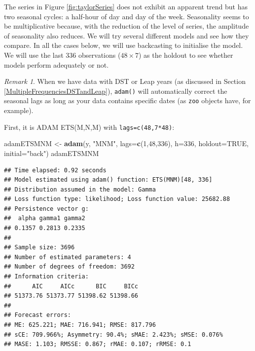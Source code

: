 \documentclass[]{book}
\newenvironment{Shaded}{\begin{snugshade}}{\end{snugshade}}
\newcommand{\DataTypeTok}[1]{\textcolor[rgb]{0.13,0.29,0.53}{#1}}
\newcommand{\DecValTok}[1]{\textcolor[rgb]{0.00,0.00,0.81}{#1}}
\newcommand{\KeywordTok}[1]{\textcolor[rgb]{0.13,0.29,0.53}{\textbf{#1}}}
\newcommand{\NormalTok}[1]{#1}
\newcommand{\OtherTok}[1]{\textcolor[rgb]{0.56,0.35,0.01}{#1}}
\newcommand{\StringTok}[1]{\textcolor[rgb]{0.31,0.60,0.02}{#1}}
\theoremstyle{definition}
\theoremstyle{definition}
\theoremstyle{definition}
\theoremstyle{definition}
\theoremstyle{remark}
\newtheorem*{remark}{Remark}
\begin{document}
The series in Figure \ref{fig:taylorSeries} does not exhibit an apparent trend but has two seasonal cycles: a half-hour of day and day of the week. Seasonality seems to be multiplicative because, with the reduction of the level of series, the amplitude of seasonality also reduces. We will try several different models and see how they compare. In all the cases below, we will use backcasting to initialise the model. We will use the last 336 observations (\(48 \times 7\)) as the holdout to see whether models perform adequately or not.

\begin{remark}
When we have data with DST or Leap years (as discussed in Section \ref{MultipleFrequenciesDSTandLeap}), \texttt{adam()} will automatically correct the seasonal lags as long as your data contains specific dates (as \texttt{zoo} objects have, for example).
\end{remark}

First, it is ADAM ETS(M,N,M) with \texttt{lags=c(48,7*48)}:

\begin{Shaded}
\begin{Highlighting}[]
\NormalTok{adamETSMNM <-}\StringTok{ }\KeywordTok{adam}\NormalTok{(y, }\StringTok{"MNM"}\NormalTok{, }\DataTypeTok{lags=}\KeywordTok{c}\NormalTok{(}\DecValTok{1}\NormalTok{,}\DecValTok{48}\NormalTok{,}\DecValTok{336}\NormalTok{),}
                   \DataTypeTok{h=}\DecValTok{336}\NormalTok{, }\DataTypeTok{holdout=}\OtherTok{TRUE}\NormalTok{,}
                   \DataTypeTok{initial=}\StringTok{"back"}\NormalTok{)}
\NormalTok{adamETSMNM}
\end{Highlighting}
\end{Shaded}

\begin{verbatim}
## Time elapsed: 0.92 seconds
## Model estimated using adam() function: ETS(MNM)[48, 336]
## Distribution assumed in the model: Gamma
## Loss function type: likelihood; Loss function value: 25682.88
## Persistence vector g:
##  alpha gamma1 gamma2 
## 0.1357 0.2813 0.2335 
## 
## Sample size: 3696
## Number of estimated parameters: 4
## Number of degrees of freedom: 3692
## Information criteria:
##      AIC     AICc      BIC     BICc 
## 51373.76 51373.77 51398.62 51398.66 
## 
## Forecast errors:
## ME: 625.221; MAE: 716.941; RMSE: 817.796
## sCE: 709.966%; Asymmetry: 90.4%; sMAE: 2.423%; sMSE: 0.076%
## MASE: 1.103; RMSSE: 0.867; rMAE: 0.107; rRMSE: 0.1
\end{verbatim}
\end{document}
